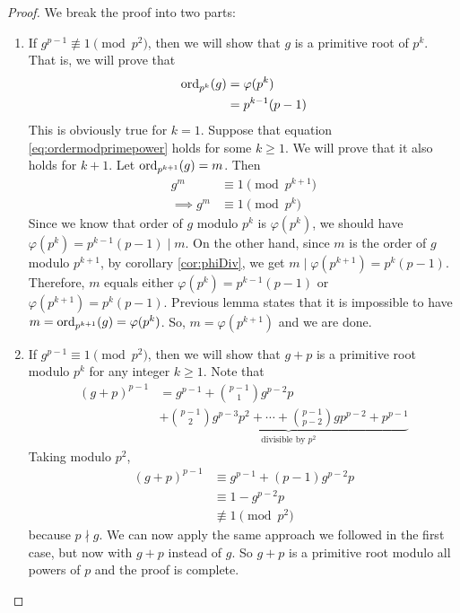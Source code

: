 \begin{proof}
	We break the proof into two parts:
	\begin{enumerate}
		\item If $g^{p-1} \not \equiv 1 \pmod{p^2}$, then we will show that $g$ is a primitive root of $p^k$. That is, we will prove that
			\begin{align}\label{eq:ordermodprimepower}
				\operatorname{ord}_{p^k} (g)
					& =\varphi(p^k)\\
					& =p^{k-1}(p-1)
			\end{align}
		This is obviously true for $k=1$. Suppose that equation \eqref{eq:ordermodprimepower} holds for some $k\geq 1$. We will prove that it also holds for $k+1$. Let $\operatorname{ord}_{p^{k+1}} (g)=m$. Then
			\begin{align*}
				g^m
					& \equiv 1 \pmod{p^{k+1}}\\
				\implies g^m
					& \equiv 1 \pmod{p^{k}}
			\end{align*}
		Since we know that order of $g$ modulo $p^k$ is $\varphi(p^k)$, we should have $\varphi(p^k)=p^{k-1}(p-1)\mid m$. On the other hand, since $m$ is the order of $g$ modulo $p^{k+1}$, by corollary \eqref{cor:phiDiv}, we get $m\mid \varphi(p^{k+1})=p^k(p-1)$. Therefore, $m$ equals either $\varphi(p^k)=p^{k-1}(p-1)$ or $\varphi(p^{k+1})=p^{k}(p-1)$. Previous lemma states that it is impossible to have $m=\operatorname{ord}_{p^{k+1}} (g)=\varphi(p^k)$. So, $m=\varphi(p^{k+1})$ and we are done.

		\item If $g^{p-1} \equiv 1 \pmod{p^2}$, then we will show that $g+p$ is a primitive root modulo $p^k$ for any integer $k\geq 1$. Note that
			\begin{align*}
				(g+p)^{p-1}
					& = g^{p-1} + \binom{p-1}{1} g^{p-2}p \\
					& + \underbrace{\binom{p-1}{2}g^{p-3}p^2+\cdots + \binom{p-1}{p-2} gp^{p-2} + p^{p-1}}_{\mbox{divisible by } p^2}
			\end{align*}
		Taking modulo $p^2$,
			\begin{align*}
				(g+p)^{p-1}
					& \equiv g^{p-1}+(p-1)g^{p-2}p\\
					& \equiv 1 - g^{p-2}p\\
					& \not \equiv 1 \pmod{p^2}
			\end{align*}
		because $p \nmid g$. We can now apply the same approach we followed in the first case, but now with $g+p$ instead of $g$. So $g+p$ is a primitive root modulo all powers of $p$ and the proof is complete.
	\end{enumerate}
\end{proof}

